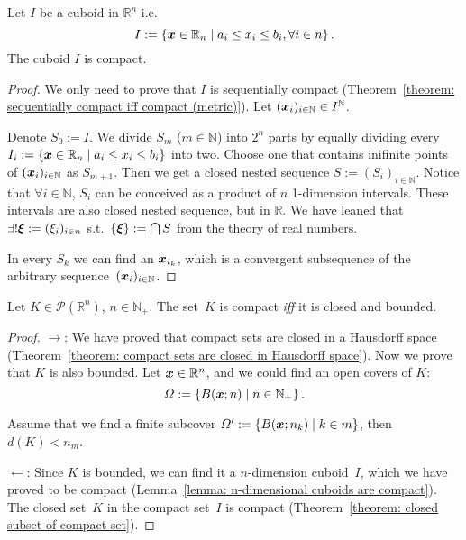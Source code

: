 \documentclass[openany]{book}
\begin{document}
\begin{lemma}
	\label{lemma: n-dimensional cuboids are compact}
	Let $I$ be a cuboid in $\mathbb R^n$ i.e.\ 
	\begin{equation*}
		I := \{\boldsymbol{x} \in \mathbb R_n \mid a_i \leq x_i \leq b_i, \forall i \in n\}\,.
	\end{equation*}
	The cuboid $I$ is compact.
\end{lemma}
\begin{proof}
	We only need to prove that $I$ is sequentially compact (Theorem~\ref{theorem: sequentially compact iff compact (metric)}). 
	Let $(\boldsymbol{x}_i)_{i \in \mathbb N} \in I^\mathbb N$. 
	
	Denote $S_0 := I$.
	We divide $S_m$ ($m \in \mathbb N$) into $2^n$ parts by equally dividing every $I_i := \{\boldsymbol{x} \in \mathbb R_n \mid a_i \leq x_i \leq b_i\}$ into two. 
	Choose one that contains inifinite points of $(\boldsymbol{x}_i)_{i \in \mathbb N}$ as $S_{m+1}$. 
	Then we get a closed nested sequence $S := (S_i)_{i \in \mathbb N}$.
	Notice that $\forall i \in \mathbb N$, $S_i$ can be conceived as a product of $n$ 1-dimension intervals. These intervals are also closed nested sequence, but in $\mathbb R$. 
	We have leaned that $\exists! \boldsymbol{\xi} := (\xi_i)_{i \in n}$ s.t.\ $\{\boldsymbol{\xi}\} := \bigcap S$ from the theory of real numbers.

	In every $S_k$ we can find an $\boldsymbol{x}_{i_k}$, which is a convergent subsequence of the arbitrary sequence~$(\boldsymbol{x}_i)_{i \in \mathbb N}$.
\end{proof}

\begin{theorem}
	\label{theorem: compact iff closed and bounded in Rn}
	Let $K \in \mathscr P(\mathbb R^n)$, $n \in \mathbb N_+$.
	The set~$K$ is compact \emph{iff} it is closed and bounded.
\end{theorem}
\begin{proof}
	$\to$: 
	We have proved that compact sets are closed in a Hausdorff space (Theorem~\ref{theorem: compact sets are closed in Hausdorff space}). 
	Now we prove that $K$ is also bounded. 
	Let $\boldsymbol{x} \in \mathbb R^n$, and we could find an open covers of $K$: 
	\begin{equation*}
		\varOmega := \{B(\boldsymbol{x}; n) \mid n \in \mathbb N_+\}\,.
	\end{equation*}

	Assume that we find a finite subcover $\varOmega' := \{B(\boldsymbol{x}; n_k) \mid k \in m\}$, then $d(K) < n_m$.

	$\gets$: Since $K$ is bounded, we can find it a $n$-dimension cuboid~$I$, which we have proved to be compact (Lemma~\ref{lemma: n-dimensional cuboids are compact}). 
	The closed set~$K$ in the compact set~$I$ is compact (Theorem~\ref{theorem: closed subset of compact set}).

\end{proof}
\end{document}

